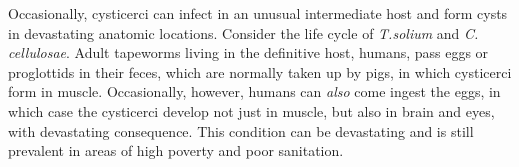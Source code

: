 \documentclass[openany]{book}
\begin{document}
Occasionally, cysticerci can infect in an unusual intermediate host and
form cysts in devastating anatomic locations. Consider the life cycle of
\emph{T.solium} and \emph{C. cellulosae}. Adult tapeworms living in the
definitive host, humans, pass eggs or proglottids in their feces, which
are normally taken up by pigs, in which cysticerci form in muscle.
Occasionally, however, humans can \emph{also} come ingest the eggs, in
which case the cysticerci develop not just in muscle, but also in brain
and eyes, with devastating consequence. This condition can be
devastating and is still prevalent in areas of high poverty and poor
sanitation.


\end{document}
